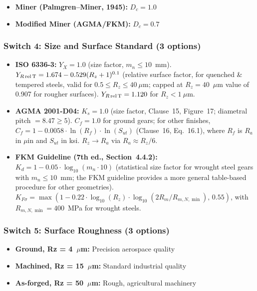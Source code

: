 \documentclass[12pt,a4paper]{article}
\begin{document}
\begin{itemize}
  \item \textbf{Miner (Palmgren--Miner, 1945):} $D_c = 1.0$
  \item \textbf{Modified Miner (AGMA/FKM):} $D_c = 0.7$
\end{itemize}

\subsubsection{Switch 4: Size and Surface Standard (3 options)}

\begin{itemize}
  \item \textbf{ISO 6336-3:} $Y_X = 1.0$ (size factor, $m_n \leq 10$~mm).
        $Y_{R\,\rm rel\,T} = 1.674 - 0.529(R_z+1)^{0.1}$ (relative
        surface factor, for quenched \& tempered steels, valid for
        $0.5 \leq R_z \leq 40~\mu$m; capped at $R_z=40$~$\mu$m value
        of 0.907 for rougher surfaces). $Y_{R\,\rm rel\,T} = 1.120$
        for $R_z < 1~\mu$m.
  \item \textbf{AGMA 2001-D04:} $K_s = 1.0$ (size factor, Clause~15,
        Figure~17; diametral pitch $=8.47 \geq 5$).
        $C_f = 1.0$ for ground gears; for other finishes,
        $C_f = 1 - 0.0058 \cdot \ln(R_f) \cdot \ln(S_{ut})$
        (Clause~16, Eq.~16.1), where $R_f$ is $R_a$ in $\mu$in
        and $S_{ut}$ in ksi. $R_z \rightarrow R_a$ via
        $R_a \approx R_z/6$.
  \item \textbf{FKM Guideline (7th ed., Section~4.4.2):}
        $K_d = 1 - 0.05 \cdot \log_{10}(m_n \cdot 10)$ (statistical size
        factor for wrought steel gears with $m_n \leq 10$~mm;
        the FKM guideline provides a more general table-based procedure
        for other geometries).
        $K_{F\sigma} = \max(1 - 0.22 \cdot \log_{10}(R_z) \cdot
        \log_{10}(2R_m/R_{m,N,\min}),\, 0.55)$, with
        $R_{m,N,\min}=400$~MPa for wrought steels.
\end{itemize}

\subsubsection{Switch 5: Surface Roughness (3 options)}

\begin{itemize}
  \item \textbf{Ground, Rz = 4~$\mu$m:} Precision aerospace quality
  \item \textbf{Machined, Rz = 15~$\mu$m:} Standard industrial quality
  \item \textbf{As-forged, Rz = 50~$\mu$m:} Rough, agricultural machinery
\end{itemize}
\end{document}
